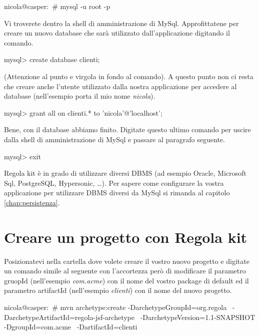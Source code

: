 \begin{bash}
nicola@casper:~# mysql -u root -p
\end{bash}

Vi troverete dentro la shell di amministrazione di MySql. Approfittatene per creare un nuovo database che sarà utilizzato dall'applicazione digitando il comando.

\begin{bash}
mysql> create database clienti;
\end{bash}

(Attenzione al punto e virgola in fondo al comando).
A questo punto non ci resta che creare anche l'utente utilizzato dalla nostra applicazione per accedere al database (nell'esempio porta il mio nome \emph{nicola}).

\begin{bash}
mysql> grant all on clienti.* to 'nicola'@'localhost';
\end{bash}

Bene, con il database abbiamo finito. Digitate questo ultimo comando per uscire dalla shell di amministrazione di MySql e passare al paragrafo seguente.

\begin{bash}
mysql> exit
\end{bash}

\begin{nota}
Regola kit è in grado di utilizzare diversi DBMS (ad esempio Oracle, Microsoft Sql, PostgreSQL, Hypersonic, \ldots). Per sapere come configurare la vostra applicazione per utilizzare DBMS diversi da MySql si rimanda al capitolo \vref{chap:persistenza}.
\end{nota}



\section{Creare un progetto con Regola kit}

Posizionatevi nella cartella dove volete creare il vostro nuovo progetto e digitate un comando simile al seguente con l'accortezza però di modificare il parametro gruopId (nell'esempio \emph{com.acme}) con il nome del vostro package di default ed il parametro  artifactId (nell'esempio  \emph{clienti}) con il nome del nuovo progetto.

\begin{bash}
nicola@casper:~# mvn archetype:create -DarchetypeGroupId=org.regola  \ 
-DarchetypeArtifactId=regola-jsf-archetype \
-DarchetypeVersion=1.1-SNAPSHOT -DgroupId=com.acme \
-DartifactId=clienti
\end{bash}

